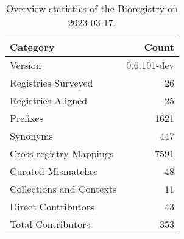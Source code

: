\begin{table}
\centering
\caption{Overview statistics of the Bioregistry on 2023-03-17.}
\label{tab:bioregistry-summary}
\begin{tabular}{lr}
\toprule
                Category &       Count \\
\midrule
                 Version & 0.6.101-dev \\
     Registries Surveyed &          26 \\
      Registries Aligned &          25 \\
                Prefixes &        1621 \\
                Synonyms &         447 \\
 Cross-registry Mappings &        7591 \\
      Curated Mismatches &          48 \\
Collections and Contexts &          11 \\
     Direct Contributors &          43 \\
      Total Contributors &         353 \\
\bottomrule
\end{tabular}
\end{table}
